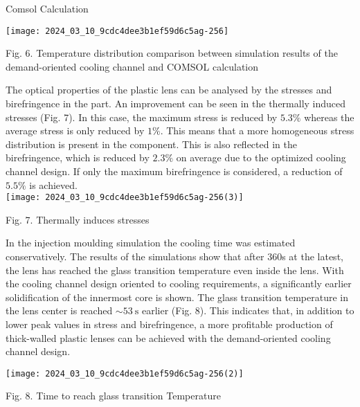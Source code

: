 \documentclass[10pt]{article}
\begin{document}
Comsol Calculation

\begin{center}
\texttt{[image: 2024\_03\_10\_9cdc4dee3b1ef59d6c5ag-256]}
\end{center}

Fig. 6. Temperature distribution comparison between simulation results of the demand-oriented cooling channel and COMSOL calculation

The optical properties of the plastic lens can be analysed by the stresses and birefringence in the part. An improvement can be seen in the thermally induced stresses (Fig. 7). In this case, the maximum stress is reduced by $5.3 \%$ whereas the average stress is only reduced by $1 \%$. This means that a more homogeneous stress distribution is present in the component. This is also reflected in the birefringence, which is reduced by $2.3 \%$ on average due to the optimized cooling channel design. If only the maximum birefringence is considered, a reduction of $5.5 \%$ is achieved.\\
\texttt{[image: 2024\_03\_10\_9cdc4dee3b1ef59d6c5ag-256(3)]}

Fig. 7. Thermally induces stresses

In the injection moulding simulation the cooling time was estimated conservatively. The results of the simulations show that after 360s at the latest, the lens has reached the glass transition temperature even inside the lens. With the cooling channel design oriented to cooling requirements, a significantly earlier solidification of the innermost core is shown. The glass transition temperature in the lens center is reached $\sim 53 \mathrm{~s}$ earlier (Fig. 8). This indicates that, in addition to lower peak values in stress and birefringence, a more profitable production of thick-walled plastic lenses can be achieved with the demand-oriented cooling channel design.

\begin{center}
\texttt{[image: 2024\_03\_10\_9cdc4dee3b1ef59d6c5ag-256(2)]}
\end{center}

Fig. 8. Time to reach glass transition Temperature
\end{document}
